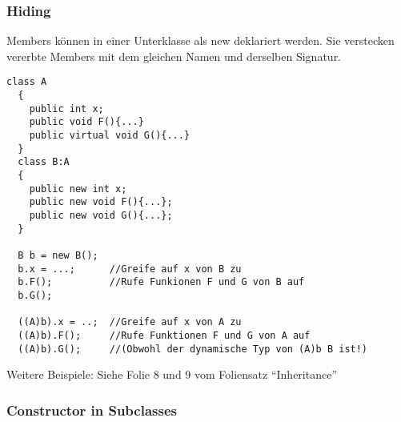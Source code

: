 \subsubsection{Hiding}
Members können in einer Unterklasse als new deklariert werden. Sie verstecken
vererbte Members mit dem gleichen Namen und derselben Signatur. 
\begin{lstlisting}[style=Csharp]
  class A
  {
    public int x; 
    public void F(){...}
    public virtual void G(){...}
  }
  class B:A
  {
    public new int x; 
    public new void F(){...};
    public new void G(){...};
  }
  
  B b = new B(); 
  b.x = ...;      //Greife auf x von B zu 
  b.F();          //Rufe Funkionen F und G von B auf
  b.G(); 
  
  ((A)b).x = ..;  //Greife auf x von A zu
  ((A)b).F();     //Rufe Funktionen F und G von A auf
  ((A)b).G();     //(Obwohl der dynamische Typ von (A)b B ist!)
\end{lstlisting}
Weitere Beispiele: Siehe Folie 8 und 9 vom Foliensatz "`Inheritance"'

\subsubsection{Constructor in Subclasses}

